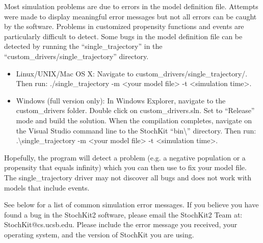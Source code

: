 \documentclass[11pt,letterpaper]{article}
\begin{document}
Most simulation problems are due to errors in the model definition file.  Attempts were made to display meaningful error messages but not all errors can be caught by the software.  Problems in customized propensity functions and events are particularly difficult to detect.
Some bugs in the model definition file can be detected by running the ``single\_trajectory'' in the ``custom\_drivers/single\_trajectory'' directory. 
\begin{itemize}
    \item Linux/UNIX/Mac OS X: Navigate to custom\_drivers/single\_trajectory/. Then run: ./single\_trajectory -m <your model file> -t <simulation time>.
    \item Windows (full version only): In Windows Explorer, navigate to the custom\_drivers folder.  Double click on custom\_drivers.sln.  Set to ``Release'' mode and build the solution.  When the compilation completes, navigate on the Visual Studio command line to the StochKit ``bin\textbackslash'' directory. Then run: .\textbackslash single\_trajectory -m <your model file> -t <simulation time>.
\end{itemize}
Hopefully, the program will detect a problem (e.g. a negative population or a propensity that equals infinity) which you can then use to fix your model file.  The single\_trajectory driver may not discover all bugs and does not work with models that include events.

See below for a list of common simulation error messages.  If you believe you have found a bug in the StochKit2 software, please email the StochKit2 Team at: StochKit@cs.ucsb.edu.  Please include the error message you received, your operating system, and the version of StochKit you are using.
\end{document}
